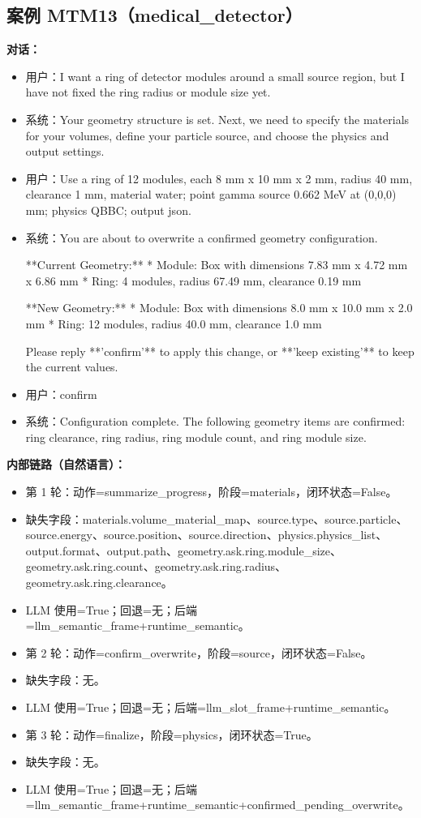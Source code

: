 \documentclass[11pt]{ctexart}
\begin{document}
\subsection{案例 MTM13（medical\_detector）}
\textbf{对话：}
\begin{itemize}
\item 用户：I want a ring of detector modules around a small source region, but I have not fixed the ring radius or module size yet.
\item 系统：Your geometry structure is set. Next, we need to specify the materials for your volumes, define your particle source, and choose the physics and output settings.
\item 用户：Use a ring of 12 modules, each 8 mm x 10 mm x 2 mm, radius 40 mm, clearance 1 mm, material water; point gamma source 0.662 MeV at (0,0,0) mm; physics QBBC; output json.
\item 系统：You are about to overwrite a confirmed geometry configuration.

**Current Geometry:**
*   Module: Box with dimensions 7.83 mm x 4.72 mm x 6.86 mm
*   Ring: 4 modules, radius 67.49 mm, clearance 0.19 mm

**New Geometry:**
*   Module: Box with dimensions 8.0 mm x 10.0 mm x 2.0 mm
*   Ring: 12 modules, radius 40.0 mm, clearance 1.0 mm

Please reply **'confirm'** to apply this change, or **'keep existing'** to keep the current values.
\item 用户：confirm
\item 系统：Configuration complete. The following geometry items are confirmed: ring clearance, ring radius, ring module count, and ring module size.
\end{itemize}
\textbf{内部链路（自然语言）：}
\begin{itemize}
\item 第 1 轮：动作=summarize\_progress，阶段=materials，闭环状态=False。
\item 缺失字段：materials.volume\_material\_map、source.type、source.particle、source.energy、source.position、source.direction、physics.physics\_list、output.format、output.path、geometry.ask.ring.module\_size、geometry.ask.ring.count、geometry.ask.ring.radius、geometry.ask.ring.clearance。
\item LLM 使用=True；回退=无；后端=llm\_semantic\_frame+runtime\_semantic。
\item 第 2 轮：动作=confirm\_overwrite，阶段=source，闭环状态=False。
\item 缺失字段：无。
\item LLM 使用=True；回退=无；后端=llm\_slot\_frame+runtime\_semantic。
\item 第 3 轮：动作=finalize，阶段=physics，闭环状态=True。
\item 缺失字段：无。
\item LLM 使用=True；回退=无；后端=llm\_semantic\_frame+runtime\_semantic+confirmed\_pending\_overwrite。
\end{itemize}
\end{document}
